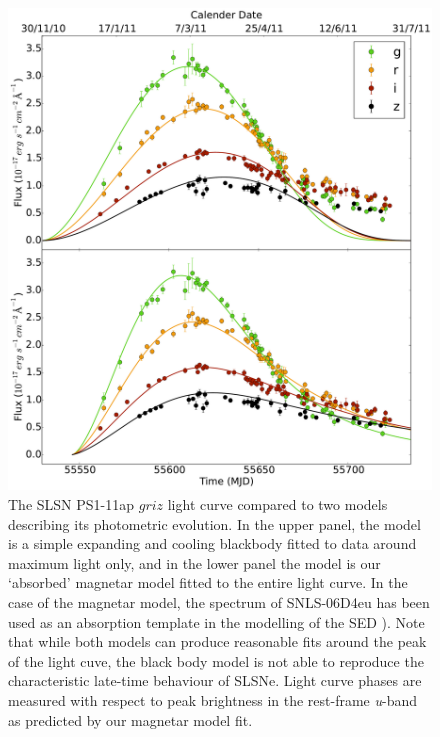 \begin{figure}
\includegraphics[width=\textwidth]{Figures/Chapter4/BB_Mag_comp}
\caption{The SLSN PS1-11ap $griz$ light curve \citep{McCrum2014} compared to two models describing its photometric evolution. In the upper panel, the model is a simple expanding and cooling blackbody fitted to data around maximum light only, and in the lower panel the model is our `absorbed' magnetar model fitted to the entire light curve. In the case of the magnetar model, the spectrum of SNLS-06D4eu \citep{Howell2013} has been used as an absorption template in the modelling of the SED ). Note that while both models can produce reasonable fits around the peak of the light cuve, the black body model is not able to reproduce the characteristic late-time behaviour of SLSNe. Light curve phases are measured with respect to peak brightness in the rest-frame \textit{u}-band as predicted by our magnetar model fit.}
\label{fig:BB_Mag}
\end{figure}

